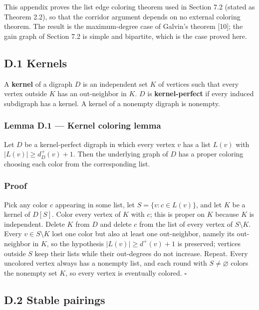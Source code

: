 \documentclass[
  11pt,
]{article}
\begin{document}
This appendix proves the list edge coloring theorem used in Section 7.2 (stated as Theorem 2.2), so that the corridor argument depends on no external coloring theorem. The result is the maximum-degree case of Galvin's theorem {[}10{]}; the gain graph of Section 7.2 is simple and bipartite, which is the case proved here.

\subsection{D.1 Kernels}\label{d.1-kernels}

A \textbf{kernel} of a digraph \(D\) is an independent set \(K\) of vertices such that every vertex outside \(K\) has an out-neighbor in \(K\). \(D\) is \textbf{kernel-perfect} if every induced subdigraph has a kernel. A kernel of a nonempty digraph is nonempty.

\subsubsection{Lemma D.1 --- Kernel coloring lemma}\label{lemma-d.1-kernel-coloring-lemma}

Let \(D\) be a kernel-perfect digraph in which every vertex \(v\) has a list \(L(v)\) with \(|L(v)|\ge d^+_D(v)+1\). Then the underlying graph of \(D\) has a proper coloring choosing each color from the corresponding list.

\subsubsection{Proof}\label{proof-7}

Pick any color \(c\) appearing in some list, let \(S=\{v:c\in L(v)\}\), and let \(K\) be a kernel of \(D[S]\). Color every vertex of \(K\) with \(c\); this is proper on \(K\) because \(K\) is independent. Delete \(K\) from \(D\) and delete \(c\) from the list of every vertex of \(S\setminus K\). Every \(v\in S\setminus K\) lost one color but also at least one out-neighbor, namely its out-neighbor in \(K\), so the hypothesis \(|L(v)|\ge d^+(v)+1\) is preserved; vertices outside \(S\) keep their lists while their out-degrees do not increase. Repeat. Every uncolored vertex always has a nonempty list, and each round with \(S\ne\varnothing\) colors the nonempty set \(K\), so every vertex is eventually colored. \(\square\)

\subsection{D.2 Stable pairings}\label{d.2-stable-pairings}
\end{document}
